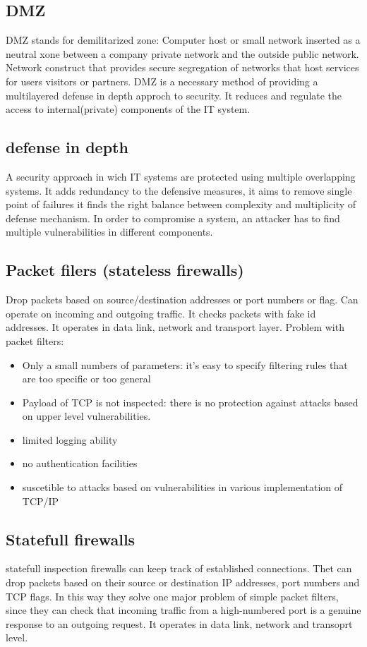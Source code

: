 \subsection{DMZ}
DMZ stands for demilitarized zone: Computer host or small network inserted as a neutral xone
between a company private network and the outside public network. Network construct that provides secure segregation of networks that host services for users visitors or partners.
DMZ is a necessary method of providing a multilayered defense in depth approch to security. It reduces and regulate
the access to internal(private) components of the IT system.

\subsection{defense in depth}
A security approach in wich IT systems are protected using multiple overlapping systems. It adds redundancy to the defensive measures, it aims to remove single point of failures
it finds the right balance between complexity and multiplicity of defense mechanism. In order to compromise a system, an attacker has to find multiple vulnerabilities in different components.

\subsection{Packet filers (stateless firewalls)}
Drop packets based on source/destination addresses or port numbers or flag. Can operate
on incoming and outgoing traffic. It checks packets with fake id addresses. It operates in data link, network and transport layer.
Problem with packet filters:
\begin{itemize}
    \item Only a small numbers of parameters: it's easy to specify filtering rules that are too specific or too general
    \item Payload of TCP is not inspected: there is no protection against attacks based on upper level vulnerabilities.
    \item limited logging ability
    \item no authentication facilities
    \item suscetible to attacks based on vulnerabilities in various implementation of TCP/IP
\end{itemize}

\subsection{Statefull firewalls}
statefull inspection firewalls can keep track of established connections. Thet can drop packets
based on their source or destination IP addresses, port numbers and TCP flags. In this way they solve
one major problem of simple packet filters, since they can check that incoming traffic from a high-numbered port is a 
genuine response to an outgoing request. 
It operates in data link, network and transoprt level.

